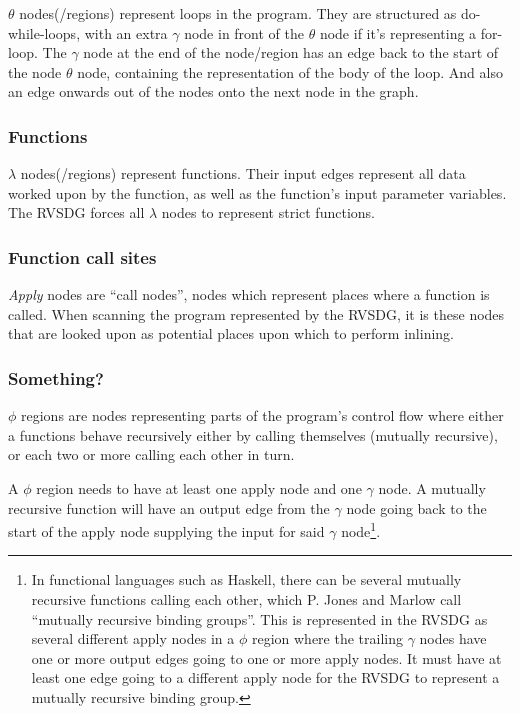 \textit{$\theta$} nodes(/regions) represent loops in the program. They are
structured as do-while-loops, with an extra $\gamma$ node in front of the
$\theta$ node if it's representing a for-loop. The $\gamma$ node at the end of
the node/region has an edge back to the start of the node $\theta$ node,
containing the representation of the body of the loop. And also an edge onwards
out of the nodes onto the next node in the graph.

\subsubsection{Functions}

\textit{$\lambda$} nodes(/regions) represent functions. Their input
edges represent all data worked upon by the function, as well as the function's
input parameter variables. The RVSDG forces all $\lambda$ nodes to represent
strict functions.

\subsubsection{Function call sites}

\textit{Apply} nodes are ``call nodes'', nodes which represent places
where a function is called. When scanning the program represented by the RVSDG,
it is these nodes that are looked upon as potential places upon which to perform
inlining.

\subsubsection{Something?}

\textit{$\phi$} regions are nodes representing parts of the program's
control flow where either a functions behave recursively either by calling
themselves (mutually recursive), or each two or more calling each other in turn.

A $\phi$ region needs to have at least one apply node and one $\gamma$ node. A
mutually recursive function will have an output edge from the $\gamma$ node
going back to the start of the apply node supplying the input for said $\gamma$
node\footnote{In functional languages such as Haskell, there can be several
mutually recursive functions calling each other, which P. Jones and Marlow
\cite{GHCPaper} call ``mutually recursive binding groups''. This is represented
in the RVSDG as several different apply nodes in a $\phi$ region  where the
trailing $\gamma$ nodes have one or more output edges going to one or more apply
nodes. It must have at least one edge going to a different apply node for the
RVSDG to represent a mutually recursive binding group.}.

